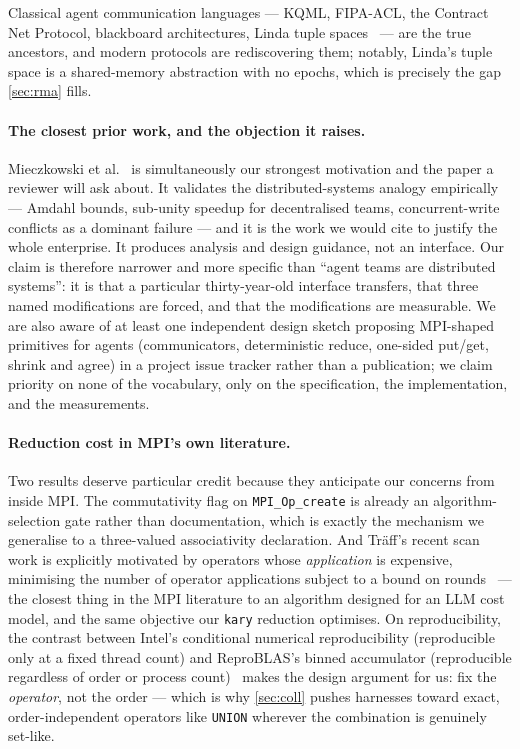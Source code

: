 \documentclass[10pt,twocolumn]{article}
\theoremstyle{definition}
\theoremstyle{plain}
\newcommand{\code}[1]{\texttt{\small #1}}
\begin{document}
Classical agent communication languages --- KQML, FIPA-ACL, the Contract Net
Protocol, blackboard architectures, Linda tuple
spaces~\cite{kqml,fipaacl,contractnet,hearsay,carriero89-linda,jade} --- are the true
ancestors, and modern protocols are rediscovering them; notably, Linda's tuple space
is a shared-memory abstraction with no epochs, which is precisely the gap
\cref{sec:rma} fills.

\paragraph{The closest prior work, and the objection it raises.} Mieczkowski et
al.~\cite{lmteams26} is simultaneously our strongest motivation and the paper a
reviewer will ask about. It validates the distributed-systems analogy empirically ---
Amdahl bounds, sub-unity speedup for decentralised teams, concurrent-write conflicts
as a dominant failure --- and it is the work we would cite to justify the whole
enterprise. It produces analysis and design guidance, not an interface. Our claim is
therefore narrower and more specific than ``agent teams are distributed systems'':
it is that a particular thirty-year-old interface transfers, that three named
modifications are forced, and that the modifications are measurable. We are also
aware of at least one independent design sketch proposing MPI-shaped primitives for
agents (communicators, deterministic reduce, one-sided put/get, shrink and agree) in
a project issue tracker rather than a publication; we claim priority on none of the
vocabulary, only on the specification, the implementation, and the measurements.

\paragraph{Reduction cost in MPI's own literature.} Two results deserve particular
credit because they anticipate our concerns from inside MPI. The commutativity flag
on \code{MPI\_Op\_create} is already an algorithm-selection gate rather than
documentation, which is exactly the mechanism we generalise to a three-valued
associativity declaration. And Tr\"aff's recent scan work is explicitly motivated by
operators whose \emph{application} is expensive, minimising the number of operator
applications subject to a bound on rounds~\cite{traff25exscan} --- the closest thing
in the MPI literature to an algorithm designed for an LLM cost model, and the same
objective our \code{kary} reduction optimises. On reproducibility, the contrast
between Intel's conditional numerical reproducibility (reproducible only at a fixed
thread count) and ReproBLAS's binned accumulator (reproducible regardless of order or
process count)~\cite{IntelCNR,ReproBLAS,Demmel15} makes the design argument for us:
fix the \emph{operator}, not the order --- which is why \cref{sec:coll} pushes
harnesses toward exact, order-independent operators like \code{UNION} wherever the
combination is genuinely set-like.
\end{document}
